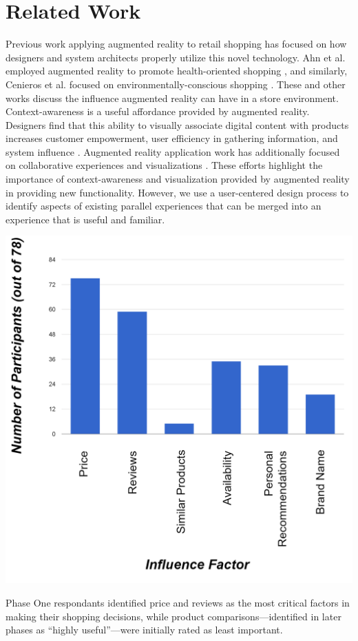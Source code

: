 \section{Related Work}

Previous work applying augmented reality to retail shopping has focused on how designers and system architects properly utilize this novel technology. Ahn et al. employed augmented reality to promote health-oriented shopping \cite{ahn2015supporting}, and similarly, Cenieros et al. focused on environmentally-conscious shopping \cite{ceniceros2014augmented}. These and other works \cite{esser2016head,stoyanova2015comparison} discuss the influence augmented reality can have in a store environment. Context-awareness is a useful affordance provided by augmented reality.  Designers find that this ability to visually associate digital content with products increases customer empowerment, user efficiency in gathering information, and system influence \cite{kourouthanassis2007enhancing,olsson2013expected,zhu2004personalized}. Augmented reality application work has additionally focused on collaborative experiences and visualizations \cite{esser2016head,santos2016augmented,stoyanova2015comparison,truong2013today}. These efforts highlight the importance of context-awareness and visualization provided by augmented reality in providing new functionality. However, we use a user-centered design process to identify aspects of existing parallel experiences that can be merged into an experience that is useful and familiar.

\begin{marginfigure}
	\begin{minipage}{\marginparwidth}
		\includegraphics[width=0.9\columnwidth]{figures/ShoppingFactors}
		\caption{Phase One respondants identified price and reviews as the most critical factors in making their shopping decisions, while product comparisons---identified in later phases as ``highly useful''---were initially rated as least important.}
		\label{figures:ShoppingFactors}
	\end{minipage}
\end{marginfigure}

